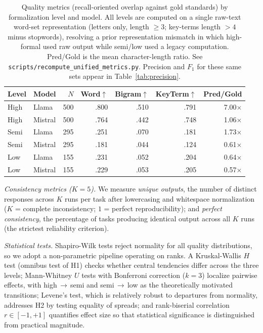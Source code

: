\documentclass[runningheads]{llncs}
\begin{document}
\begin{table}[htbp]
\centering
\caption{Quality metrics (recall-oriented overlap against gold standards) by formalization level and model. All levels are computed on a single raw-text word-set representation (letters only, length $\geq 3$; key-terms length $>4$ minus stopwords), resolving a prior representation mismatch in which high-formal used raw output while semi/low used a legacy computation. Pred/Gold is the mean character-length ratio. See \texttt{scripts/recompute\_unified\_metrics.py}. Precision and $F_1$ for these same sets appear in Table~\ref{tab:precision}.}
\label{tab:quality}
\setlength{\tabcolsep}{5pt}
\begin{tabular}{llrrrrr}
\toprule
Level & Model & $N$ & Word$\uparrow$ & Bigram$\uparrow$ & KeyTerm$\uparrow$ & Pred/Gold \\
\midrule
High  & Llama   & 500 & .800 & .510 & .791 & 7.00$\times$ \\
High  & Mistral & 500 & .764 & .442 & .748 & 1.06$\times$ \\
Semi  & Llama   & 295 & .251 & .070 & .181 & 1.73$\times$ \\
Semi  & Mistral & 295 & .181 & .044 & .124 & 0.61$\times$ \\
Low   & Llama   & 155 & .231 & .052 & .204 & 0.64$\times$ \\
Low   & Mistral & 155 & .229 & .053 & .205 & 0.57$\times$ \\
\bottomrule
\end{tabular}
\end{table}

\noindent
\textit{Consistency metrics ($K\!=\!5$).}
We measure \textit{unique outputs}, the number of distinct responses across $K$ runs per task after lowercasing and whitespace normalization ($K$ = complete inconsistency; $1$ = perfect reproducibility); and \textit{perfect consistency}, the percentage of tasks producing identical output across all $K$ runs (the strictest reliability criterion).

\vspace{5pt}
\noindent
\textit{Statistical tests.}
Shapiro-Wilk tests reject normality for all quality distributions, so we adopt a non-parametric pipeline operating on ranks. A Kruskal-Wallis $H$ test (omnibus test of H1) checks whether central tendencies differ across the three levels; Mann-Whitney $U$ tests with Bonferroni correction ($k\!=\!3$) localize pairwise effects, with high$\,\to\,$semi and semi$\,\to\,$low as the theoretically motivated transitions; Levene's test, which is relatively robust to departures from normality, addresses H2 by testing equality of spreads; and rank-biserial correlation $r \in [-1,+1]$ quantifies effect size so that statistical significance is distinguished from practical magnitude.
\end{document}

